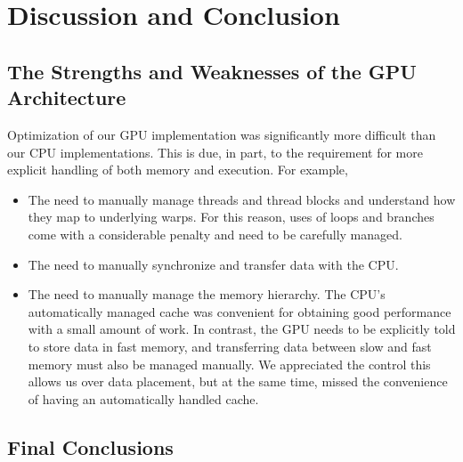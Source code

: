 \documentclass[11pt]{article} %
\begin{document}
\section{Discussion and Conclusion}
\label{conclusion-section}

\subsection{The Strengths and Weaknesses of the GPU Architecture}
Optimization of our GPU implementation was significantly more difficult
than our CPU implementations. This is due, in part, to the requirement
for more explicit handling of both memory and execution. For example,
\begin{itemize}
\item The need to manually manage threads and thread blocks and understand
how they map to underlying warps. For this reason, uses of loops and
branches come with a considerable penalty and need to be carefully
managed.
\item The need to manually synchronize and transfer data with the CPU.
\item The need to manually manage the memory hierarchy. The CPU's automatically
managed cache was convenient for obtaining good performance with a
small amount of work. In contrast, the GPU needs to be explicitly
told to store data in fast memory, and transferring data between slow
and fast memory must also be managed manually. We appreciated the
control this allows us over data placement, but at the same time,
missed the convenience of having an automatically handled cache.\end{itemize}

\subsection{Final Conclusions}
\end{document}
